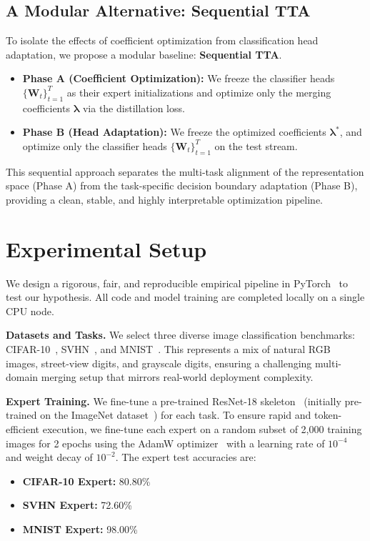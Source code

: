 \documentclass{article}
\theoremstyle{plain}
\theoremstyle{definition}
\theoremstyle{remark}
\begin{document}
\subsection{A Modular Alternative: Sequential TTA}
To isolate the effects of coefficient optimization from classification head adaptation, we propose a modular baseline: \textbf{Sequential TTA}.
\begin{itemize}
    \item \textbf{Phase A (Coefficient Optimization):} We freeze the classifier heads $\{\mathbf{W}_t\}_{t=1}^T$ as their expert initializations and optimize only the merging coefficients $\boldsymbol{\lambda}$ via the distillation loss.
    \item \textbf{Phase B (Head Adaptation):} We freeze the optimized coefficients $\boldsymbol{\lambda}^*$, and optimize only the classifier heads $\{\mathbf{W}_t\}_{t=1}^T$ on the test stream.
\end{itemize}
This sequential approach separates the multi-task alignment of the representation space (Phase A) from the task-specific decision boundary adaptation (Phase B), providing a clean, stable, and highly interpretable optimization pipeline.


\section{Experimental Setup}
\label{sec:setup}

We design a rigorous, fair, and reproducible empirical pipeline in PyTorch~\cite{paszke2019pytorch} to test our hypothesis. All code and model training are completed locally on a single CPU node.

\textbf{Datasets and Tasks.} We select three diverse image classification benchmarks: CIFAR-10~\cite{krizhevsky2009learning}, SVHN~\cite{netzer2011reading}, and MNIST~\cite{lecun1998gradient}. This represents a mix of natural RGB images, street-view digits, and grayscale digits, ensuring a challenging multi-domain merging setup that mirrors real-world deployment complexity.

\textbf{Expert Training.} We fine-tune a pre-trained ResNet-18 skeleton~\cite{he2016deep} (initially pre-trained on the ImageNet dataset~\cite{deng2009imagenet}) for each task. To ensure rapid and token-efficient execution, we fine-tune each expert on a random subset of 2,000 training images for 2 epochs using the AdamW optimizer~\cite{loshchilov2017decoupled} with a learning rate of $10^{-4}$ and weight decay of $10^{-2}$. The expert test accuracies are:
\begin{itemize}
    \item \textbf{CIFAR-10 Expert:} 80.80\%
    \item \textbf{SVHN Expert:} 72.60\%
    \item \textbf{MNIST Expert:} 98.00\%
\end{itemize}
\end{document}
